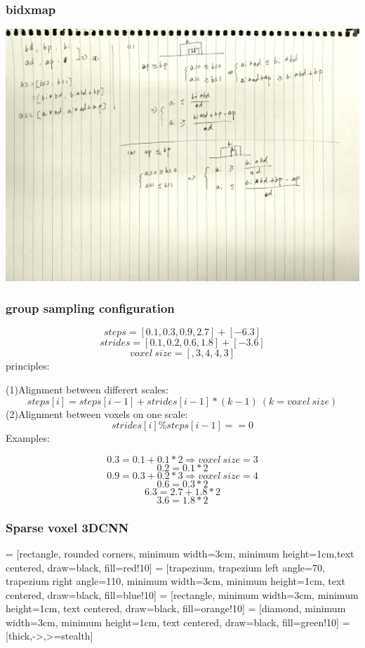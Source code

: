 \documentclass{article}
\begin{document}
\subsubsection{bidxmap}
\includegraphics[width=\textheight]{theory/bxmap.png}

\subsubsection{group sampling configuration}
$$ steps = [0.1,0.3,0.9,2.7] + [-6.3]$$
$$ strides = [0.1,0.2,0.6,1.8] + [-3.6] $$
$$ voxel\ size=[, 3, 4, 4, 3] $$
principles:\par
(1)Alignment between differert scales:
$$ steps[i] = steps[i-1]+strides[i-1]*(k-1)\  (k=voxel\ size) $$
(2)Alignment between voxels on one scale:
$$ strides[i] \% steps[i-1] == 0 $$
Examples:\par
$$ 0.3=0.1+0.1*2 \Rightarrow voxel\ size=3 $$
$$ 0.2=0.1*2 $$
$$ 0.9=0.3+0.2*3 \Rightarrow voxel\ size=4 $$ 
$$ 0.6=0.3*2 $$
$$$$
$$ 6.3=2.7+1.8*2 $$
$$ 3.6=1.8*2 $$

\subsubsection{Sparse voxel 3DCNN }
 = [rectangle, rounded corners, minimum width=3cm, minimum height=1cm,text centered, draw=black, fill=red!10]
 = [trapezium, trapezium left angle=70, trapezium right angle=110, minimum width=3cm, minimum height=1cm, text centered, draw=black, fill=blue!10]
 = [rectangle, minimum width=3cm, minimum height=1cm, text centered, draw=black, fill=orange!10]
 = [diamond, minimum width=3cm, minimum height=1cm, text centered, draw=black, fill=green!10]
 = [thick,->,>=stealth]
\end{document}
